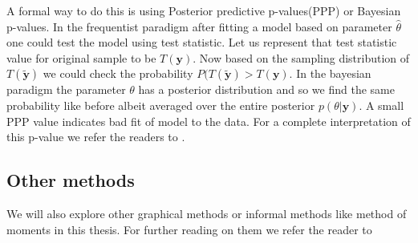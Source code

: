 A formal way to do this is using Posterior predictive p-values(PPP) or Bayesian p-values. In the frequentist paradigm after fitting a model based on parameter $\hat{\theta}$ one could test the model using test statistic. Let us represent that test statistic value for original sample to be $T(\boldsymbol{y})$. Now based on the sampling distribution of $T(\boldsymbol{\tilde{y}})$ we could check the probability $P(T(\boldsymbol{\tilde{y}}) > T(\boldsymbol{y})$. In the bayesian paradigm the parameter $\theta$ has a posterior distribution and so we find the same probability like before albeit averaged over the entire posterior $p(\theta|\boldsymbol{y})$. A small PPP value indicates bad fit of model to the data. For a complete interpretation of this p-value we refer the readers to \citet{gelman_understanding_2012}.

\subsection{Other methods}
We will also explore other graphical methods or informal methods like method of moments in this thesis. For further reading on them we refer the reader to \citet[pg. 107-114]{fruhwirth-schnatter_finite_2013}